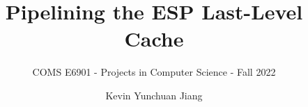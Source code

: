 \documentclass{sig-alternate}
\begin{document}
\title{\Large\bf Pipelining the ESP Last-Level Cache}
\subtitle{\normalsize COMS E6901 - Projects in Computer Science - Fall 2022}

\author{
\alignauthor
Kevin Yunchuan Jiang\\
\vspace{0.2cm}
}

\vspace{-2cm}

\maketitle

\vspace{-2cm}

\end{document}
